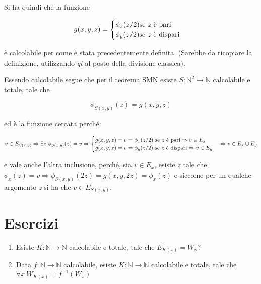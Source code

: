 Si ha quindi che la funzione 

$$
g(x,y,z) = \begin{cases}
\phi_x(z/2) \text{se \textit{z} è pari} \\
\phi_y(z/2) \text{se \textit{z} è dispari}
\end{cases}
$$

è calcolabile per come è stata precedentemente definita. (Sarebbe da ricopiare la definizione, utilizzando \textit{qt} al posto della divisione classica).

Essendo calcolabile segue che per il teorema SMN esiste $ S : \mathbb{N}^2 \rightarrow \mathbb{N} $ calcolabile e totale, tale che

$$
\phi_{S(x,y)}(z) = g(x,y,z)
$$

ed è la funzione cercata perché:

$$
v \in E_{S(x,y)} \Rightarrow \exists z | \phi_{S(x,y)}(z) = v \Rightarrow \begin{cases}
g(x,y,z) = v = \phi_x(z/2) \text{ se \textit{z} è pari} \Rightarrow v \in E_x \\
g(x,y,z) = v = \phi_y(z/2) \text{ se \textit{z} è dispari} \Rightarrow v \in E_y 
\end{cases} \Rightarrow v \in E_x \cup E_y
$$

e vale anche l'altra inclusione, perché, sia $ v \in E_x $, esiste $ z $ tale che $ \phi_x(z) = v  \Rightarrow \phi_{S(x,y)}(2z) = g(x,y,2z) = \phi_x(z)$ e siccome per un qualche argomento \textit{z} si ha che $ v \in E_{S(x,y)} $.


\section{Esercizi}

\begin{enumerate}
	\item Esiste $ K : \mathbb{N} \rightarrow \mathbb{N} $ calcolabile e totale, tale che $ E_{K(x)} = W_x $?
	\item Data $ f : \mathbb{N} \rightarrow \mathbb{N} $ calcolabile, esiste $ K : \mathbb{N} \rightarrow \mathbb{N} $ calcolabile e totale, tale che $ \forall x \: W_{K(x)} = f^{-1}(W_x) $
\end{enumerate}







